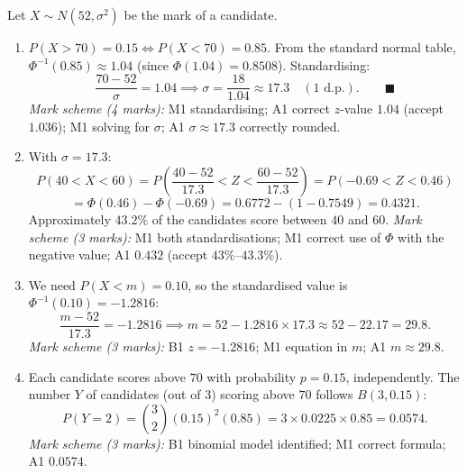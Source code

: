 \documentclass[11pt]{article}
\begin{document}
\begin{corrige}
Let $X \sim N(52, \sigma^2)$ be the mark of a candidate.

\begin{enumerate}
\item $P(X > 70) = 0.15 \iff P(X < 70) = 0.85$. From the standard normal table, $\Phi^{-1}(0.85) \approx 1.04$ (since $\Phi(1.04) = 0.8508$). Standardising:
\[
\frac{70 - 52}{\sigma} = 1.04 \implies \sigma = \frac{18}{1.04} \approx 17.3 \quad (1 \text{ d.p.}). \qquad \blacksquare
\]
\emph{Mark scheme (4 marks):} M1 standardising; A1 correct $z$-value $1.04$ (accept $1.036$); M1 solving for $\sigma$; A1 $\sigma \approx 17.3$ correctly rounded.

\item With $\sigma = 17.3$:
\[
P(40 < X < 60) = P\!\left(\frac{40-52}{17.3} < Z < \frac{60-52}{17.3}\right) = P(-0.69 < Z < 0.46)
\]
\[
= \Phi(0.46) - \Phi(-0.69) = 0.6772 - (1 - 0.7549) = 0.4321.
\]
Approximately $\boxed{43.2\%}$ of the candidates score between $40$ and $60$.
\emph{Mark scheme (3 marks):} M1 both standardisations; M1 correct use of $\Phi$ with the negative value; A1 $0.432$ (accept $43\%$–$43.3\%$).

\item We need $P(X < m) = 0.10$, so the standardised value is $\Phi^{-1}(0.10) = -1.2816$:
\[
\frac{m - 52}{17.3} = -1.2816 \implies m = 52 - 1.2816 \times 17.3 \approx 52 - 22.17 = \boxed{29.8}.
\]
\emph{Mark scheme (3 marks):} B1 $z = -1.2816$; M1 equation in $m$; A1 $m \approx 29.8$.

\item Each candidate scores above $70$ with probability $p = 0.15$, independently. The number $Y$ of candidates (out of $3$) scoring above $70$ follows $B(3, 0.15)$:
\[
P(Y = 2) = \binom{3}{2}(0.15)^2(0.85) = 3 \times 0.0225 \times 0.85 = \boxed{0.0574}.
\]
\emph{Mark scheme (3 marks):} B1 binomial model identified; M1 correct formula; A1 $0.0574$.
\end{enumerate}
\end{corrige}
\end{document}
